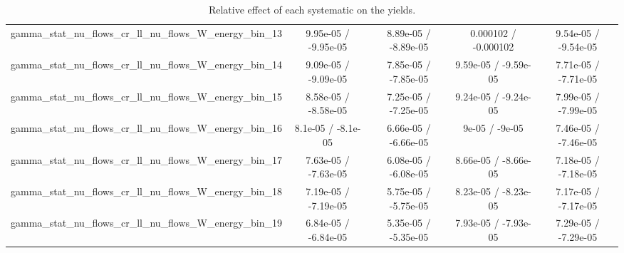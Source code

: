 \documentclass[10pt]{article}
\begin{document}
\begin{table}[htbp]
\begin{center}
\begin{tabular}{|c|c|c|c|c|}
  gamma_stat_nu_flows_cr_ll_nu_flows_W_energy_bin_13 & 9.95e-05 / -9.95e-05 & 8.89e-05 / -8.89e-05 & 0.000102 / -0.000102 & 9.54e-05 / -9.54e-05 \\ 
  gamma_stat_nu_flows_cr_ll_nu_flows_W_energy_bin_14 & 9.09e-05 / -9.09e-05 & 7.85e-05 / -7.85e-05 & 9.59e-05 / -9.59e-05 & 7.71e-05 / -7.71e-05 \\ 
  gamma_stat_nu_flows_cr_ll_nu_flows_W_energy_bin_15 & 8.58e-05 / -8.58e-05 & 7.25e-05 / -7.25e-05 & 9.24e-05 / -9.24e-05 & 7.99e-05 / -7.99e-05 \\ 
  gamma_stat_nu_flows_cr_ll_nu_flows_W_energy_bin_16 & 8.1e-05 / -8.1e-05 & 6.66e-05 / -6.66e-05 & 9e-05 / -9e-05 & 7.46e-05 / -7.46e-05 \\ 
  gamma_stat_nu_flows_cr_ll_nu_flows_W_energy_bin_17 & 7.63e-05 / -7.63e-05 & 6.08e-05 / -6.08e-05 & 8.66e-05 / -8.66e-05 & 7.18e-05 / -7.18e-05 \\ 
  gamma_stat_nu_flows_cr_ll_nu_flows_W_energy_bin_18 & 7.19e-05 / -7.19e-05 & 5.75e-05 / -5.75e-05 & 8.23e-05 / -8.23e-05 & 7.17e-05 / -7.17e-05 \\ 
  gamma_stat_nu_flows_cr_ll_nu_flows_W_energy_bin_19 & 6.84e-05 / -6.84e-05 & 5.35e-05 / -5.35e-05 & 7.93e-05 / -7.93e-05 & 7.29e-05 / -7.29e-05 \\ 
\hline 
\end{tabular} 
\caption{Relative effect of each systematic on the yields.} 
\end{center} 
\end{table} 
\end{document}
